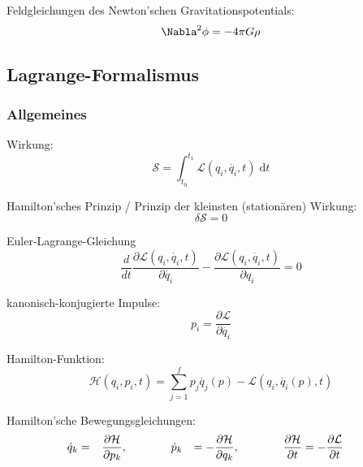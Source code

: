 \documentclass[11pt]{article}
\numberwithin{equation}{section}
\begin{document}
        Feldgleichungen des Newton'schen Gravitationspotentials:
        \begin{equation}
          \Nabla^2\phi=-4\pi G\rho
        \end{equation}

    \subsection{Lagrange-Formalismus}
      \subsubsection{Allgemeines}
        Wirkung:
        \begin{equation}
          \mathcal{S}=\int_{t_0}^{t_1}\mathcal{L}(q_i, \dot{q_i},t)\;\mathrm{d} t
        \end{equation}

        Hamilton'sches Prinzip / Prinzip der kleinsten (stationären) Wirkung:
        \begin{equation}
          \delta \mathcal{S}=0
        \end{equation}

        Euler-Lagrange-Gleichung
        \begin{equation}
           \frac{d}{dt} \frac{\partial \mathcal{L}(q_{i},\dot{q_{i}},t)}{\partial \dot{q_{i}}} - \frac{\partial \mathcal{L}(q_{i},\dot{q_{i}},t)}{\partial q_{i}} = 0
        \end{equation}

        kanonisch-konjugierte Impulse:
        \begin{equation}
          p_i=\frac{\partial \mathcal{L}}{\partial\dot{q_i}}
        \end{equation}

        Hamilton-Funktion:
        \begin{equation}
          \mathcal{H}(q_i,p_i,t)=\sum_{j=1}^{f}p_j\dot{q_j}(p) - \mathcal{L}(q_i, \dot{q_i}(p),t)
        \end{equation}

        Hamilton'sche Bewegungsgleichungen:
        \begin{equation}
          \begin{aligned}
            \dot{q}_k &= \phantom{-}\frac{\partial \mathcal{H}}{\partial p_k}, &&\hspace{30pt}
            \dot{p}_k &= -\frac{\partial \mathcal{H}}{\partial q_k}, &&\hspace{30pt}
            \frac{\partial \mathcal{H}}{\partial t} &= -\frac{\partial \mathcal{L}}{\partial t}
          \end{aligned}
        \end{equation}
\end{document}
